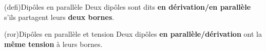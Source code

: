\documentclass[../../main/main.tex]{subfiles}
\begin{document}
\begin{tcb*}[sidebyside, righthand ratio=.4](defi){Dipôles en parallèle}
	Deux dipôles sont dits \textbf{en dérivation/en parallèle} s'ils partagent
	leurs \textbf{deux bornes}.
	\tcblower
	\begin{center}
	\end{center}
\end{tcb*}
\begin{tcb*}[label=ror:serdiv, fontupper=\Large, cnt](ror){Dipôles en parallèle
			et tension}
	Deux dipôles \textbf{en parallèle/dérivation} ont la \textbf{même tension} à
	leurs bornes.
\end{tcb*}
\end{document}
